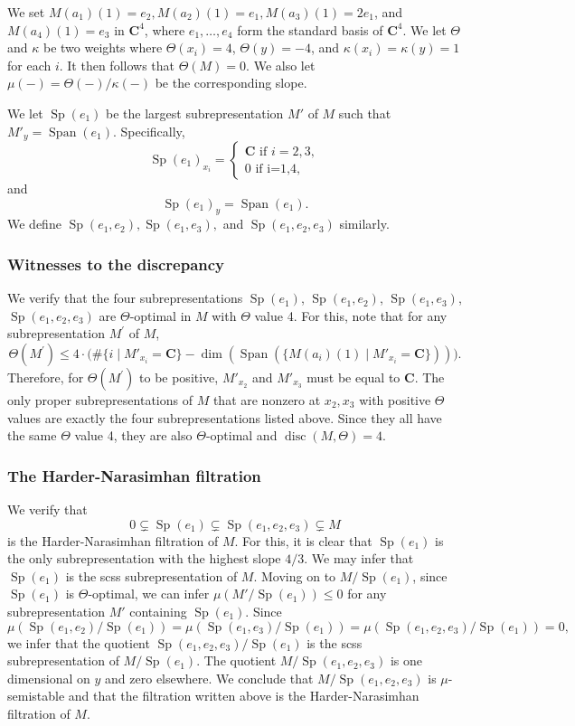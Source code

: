 \documentclass[a4paper]{amsart}
\numberwithin{equation}{section}
\theoremstyle{plain}
\theoremstyle{definition}
\DeclareMathOperator{\Sp}{Sp}
\DeclareMathOperator{\Span}{Span}
\DeclareMathOperator{\disc}{disc}
\begin{document}
We set $M(a_1)(1)=e_{2}, M(a_2)(1)=e_{1}, M(a_{3})(1)=2e_{1}$, and  $M(a_{4})(1)=e_{3}$ in $\mathbf{C}^{4}$, where $e_1,\ldots,e_4$ form the standard basis of $\mathbf{C}^4$. We let $\Theta$ and $\kappa$ be two weights where $\Theta(x_{i}) = 4$, $\Theta(y)=-4$, and $\kappa(x_i)=\kappa(y) = 1$ for each $i$. It then follows that $\Theta(M) = 0$. We also let $\mu(-) = \Theta(-)/\kappa(-)$ be the corresponding slope. 

We let $\Sp(e_1)$ be the largest subrepresentation $M'$ of $M$ such that $M'_y=\Span(e_1)$. Specifically,  $$\Sp(e_1)_{x_{i}}=\begin{cases}
\mathbf{C}\text{ if }i=2,3,\\
0\text{ if i=1,4},
\end{cases}$$
and $$\Sp(e_1)_y=\Span(e_1).$$ We define $\Sp(e_1,e_2),\Sp(e_1,e_3),$ and $\Sp(e_1,e_2,e_3)$ similarly. 
\subsubsection{Witnesses to the discrepancy}
We verify that the four subrepresentations $\Sp(e_{1})$, $\Sp(e_{1},e_{2})$, $\Sp(e_{1},e_{3})$, $\Sp(e_{1},e_{2},e_{3})$ are $\Theta$-optimal in $M$ with $\Theta$ value 4.   
For this, note that for any subrepresentation $M^{\prime}$ of $M$, $$\Theta(M^{\prime}) \leq 4\cdot \big(\# \{i\mid M'_{x_i}=\mathbf{C}\}-\dim(\Span(\{M(a_i)(1) \mid M'_{x_i}=\mathbf{C}\}))\big).$$ Therefore, for $\Theta(M^{\prime})$ to be positive, $M'_{x_2}$ and $M'_{x_3}$ must be equal to $\mathbf{C}$. The only proper subrepresentations of $M$ that are nonzero at $x_2,x_3$ with positive $\Theta$ values are exactly the four subrepresentations listed above. Since they all have the same $\Theta$ value 4, they are also $\Theta$-optimal and $\disc(M,\Theta)=4$. 
\subsubsection{The Harder-Narasimhan filtration}
We verify that 
$$0\subsetneq \Sp(e_1)\subsetneq \Sp(e_1,e_2,e_3)\subsetneq M$$ is the Harder-Narasimhan filtration of $M$. 
For this, it is clear that $\Sp(e_1)$ is the only subrepresentation with the highest slope $4/3$. We may infer that $\Sp(e_1)$ is the scss subrepresentation of $M$. Moving on to $M/\Sp(e_1)$, since $\Sp(e_1)$ is $\Theta$-optimal,  we can infer $\mu(M'/\Sp(e_{1}))\leq 0$ for any subrepresentation $M'$ containing $\Sp(e_1)$. Since  $$\mu(\Sp(e_1,e_2)/\Sp(e_1))=\mu(\Sp(e_1,e_3)/\Sp(e_1))=\mu(\Sp(e_1,e_2,e_3)/\Sp(e_1))=0,$$ we infer that the quotient $\Sp(e_1,e_2,e_3)/\Sp(e_1)$ is the scss subrepresentation of $M/\Sp(e_1)$. The quotient $M/\Sp(e_1,e_2,e_3)$ is one dimensional on $y$ and zero elsewhere. We conclude that $M/\Sp(e_1,e_2,e_3)$ is $\mu$-semistable and that the filtration written above is the Harder-Narasimhan filtration of $M$. 
\end{document}
